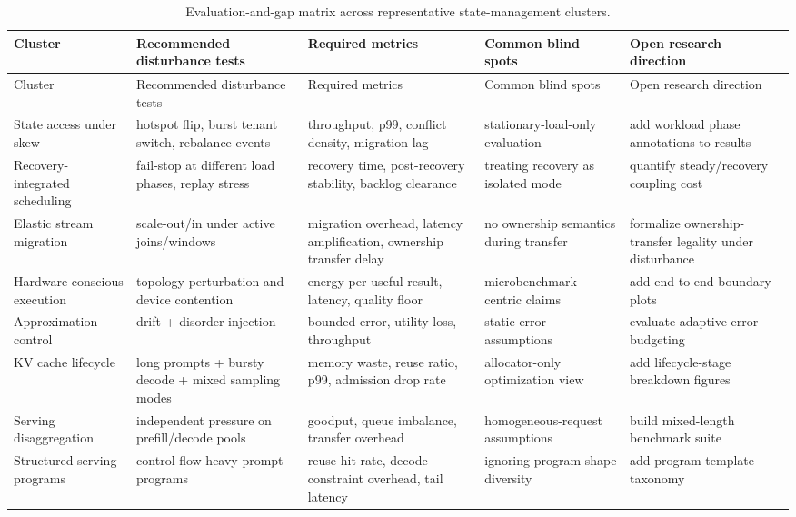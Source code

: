 \documentclass[acmsmall,screen,review]{acmart}
\begin{document}
\setlength{\tabcolsep}{3pt}
\footnotesize
\begin{longtable}{>{\raggedright\arraybackslash}p{}>{\raggedright\arraybackslash}p{}>{\raggedright\arraybackslash}p{}>{\raggedright\arraybackslash}p{}>{\raggedright\arraybackslash}p{}}
\caption{Evaluation-and-gap matrix across representative state-management clusters.}\label{tab:large-matrix-b}\\
\toprule
Cluster & Recommended disturbance tests & Required metrics & Common blind spots & Open research direction \\
\midrule
\endfirsthead
\toprule
Cluster & Recommended disturbance tests & Required metrics & Common blind spots & Open research direction \\
\midrule
\endhead
State access under skew & hotspot flip, burst tenant switch, rebalance events & throughput, p99, conflict density, migration lag & stationary-load-only evaluation & add workload phase annotations to results \\
Recovery-integrated scheduling & fail-stop at different load phases, replay stress & recovery time, post-recovery stability, backlog clearance & treating recovery as isolated mode & quantify steady/recovery coupling cost \\
Elastic stream migration & scale-out/in under active joins/windows & migration overhead, latency amplification, ownership transfer delay & no ownership semantics during transfer & formalize ownership-transfer legality under disturbance \\
Hardware-conscious execution & topology perturbation and device contention & energy per useful result, latency, quality floor & microbenchmark-centric claims & add end-to-end boundary plots \\
Approximation control & drift + disorder injection & bounded error, utility loss, throughput & static error assumptions & evaluate adaptive error budgeting \\
KV cache lifecycle & long prompts + bursty decode + mixed sampling modes & memory waste, reuse ratio, p99, admission drop rate & allocator-only optimization view & add lifecycle-stage breakdown figures \\
Serving disaggregation & independent pressure on prefill/decode pools & goodput, queue imbalance, transfer overhead & homogeneous-request assumptions & build mixed-length benchmark suite \\
Structured serving programs & control-flow-heavy prompt programs & reuse hit rate, decode constraint overhead, tail latency & ignoring program-shape diversity & add program-template taxonomy \\

\end{longtable}
\end{document}
